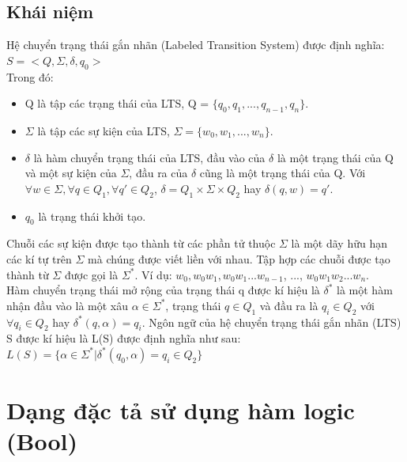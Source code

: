 \documentclass{article}
\begin{document}
\begin{flushleft}
			\subsection{Khái niệm}
				Hệ chuyển trạng thái gắn nhãn (Labeled Transition System) được định nghĩa: $S = <Q, \Sigma, \delta, q_{0}>$\\
				Trong đó:\\
				\begin{itemize}
					\item Q là tập các trạng thái của LTS, Q = $\{q_{0}, q_{1}, ..., q_{n-1}, q_{n}\}$.
					\item $\Sigma$ là tập các sự kiện của LTS, $\Sigma = \{w_{0}, w_{1}, ..., w_{n}\}$.
					\item $\delta$ là hàm chuyển trạng thái của LTS, đầu vào của  $\delta$ là một trạng thái của Q và một sự kiện của $\Sigma$, đầu ra của $\delta$ cũng là một trạng thái của Q. Với $\forall w \in \Sigma, \forall q \in Q_{1}, \forall q' \in Q_{2}$, $\delta = Q_{1} \times \Sigma \times Q_{2}$ hay $\delta(q, w) = q'$.
					\item $q_{0}$ là trạng thái khởi tạo.\\
				\end{itemize}
				Chuỗi các sự kiện được tạo thành từ các phần tử thuộc $\Sigma$ là một dãy hữu hạn các kí tự trên $\Sigma$ mà chúng được viết liền với nhau.
				Tập hợp các chuỗi được tạo thành từ $\Sigma$ được gọi là $\Sigma^*$. Ví dụ: $w_{0}, w_{0}w_{1}, w_{0}w_{1}...w_{n-1}$, ..., $w_{0}w_{1}w_{2}...w_{n}$.\\
				Hàm chuyển trạng thái mở rộng của trạng thái q được kí hiệu là $\delta^*$ là một hàm nhận đầu vào là một xâu $\alpha \in \Sigma^*$, trạng thái $q \in Q_{1}$ và đầu ra là $q_{i} \in Q_2$ với $\forall q_{i} \in Q_{2}$ hay $\delta^*(q, \alpha) = q_{i}$.
				Ngôn ngữ của hệ chuyển trạng thái gắn nhãn (LTS) S được kí hiệu là L(S) được định nghĩa như sau:
				$L(S) = \{\alpha \in \Sigma^* | \delta^*(q_{0}, \alpha) = q_i \in Q_{2}\}$\\
		\section{Dạng đặc tả sử dụng hàm logic (Bool)}

\end{flushleft}
\end{document}
